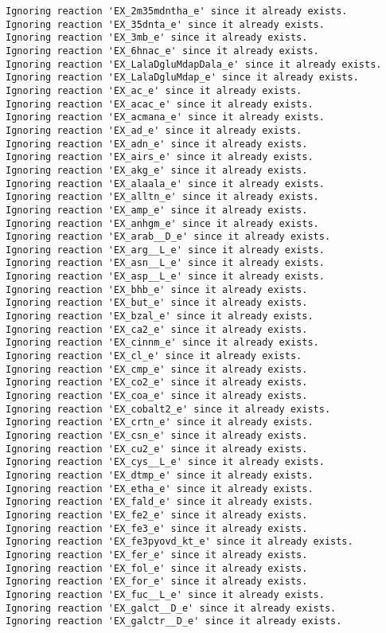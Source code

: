 \documentclass[
  letterpaper,
  DIV=11,
  numbers=noendperiod]{scrartcl}
\begin{document}
\begin{verbatim}
Ignoring reaction 'EX_2m35mdntha_e' since it already exists.
Ignoring reaction 'EX_35dnta_e' since it already exists.
Ignoring reaction 'EX_3mb_e' since it already exists.
Ignoring reaction 'EX_6hnac_e' since it already exists.
Ignoring reaction 'EX_LalaDgluMdapDala_e' since it already exists.
Ignoring reaction 'EX_LalaDgluMdap_e' since it already exists.
Ignoring reaction 'EX_ac_e' since it already exists.
Ignoring reaction 'EX_acac_e' since it already exists.
Ignoring reaction 'EX_acmana_e' since it already exists.
Ignoring reaction 'EX_ad_e' since it already exists.
Ignoring reaction 'EX_adn_e' since it already exists.
Ignoring reaction 'EX_airs_e' since it already exists.
Ignoring reaction 'EX_akg_e' since it already exists.
Ignoring reaction 'EX_alaala_e' since it already exists.
Ignoring reaction 'EX_alltn_e' since it already exists.
Ignoring reaction 'EX_amp_e' since it already exists.
Ignoring reaction 'EX_anhgm_e' since it already exists.
Ignoring reaction 'EX_arab__D_e' since it already exists.
Ignoring reaction 'EX_arg__L_e' since it already exists.
Ignoring reaction 'EX_asn__L_e' since it already exists.
Ignoring reaction 'EX_asp__L_e' since it already exists.
Ignoring reaction 'EX_bhb_e' since it already exists.
Ignoring reaction 'EX_but_e' since it already exists.
Ignoring reaction 'EX_bzal_e' since it already exists.
Ignoring reaction 'EX_ca2_e' since it already exists.
Ignoring reaction 'EX_cinnm_e' since it already exists.
Ignoring reaction 'EX_cl_e' since it already exists.
Ignoring reaction 'EX_cmp_e' since it already exists.
Ignoring reaction 'EX_co2_e' since it already exists.
Ignoring reaction 'EX_coa_e' since it already exists.
Ignoring reaction 'EX_cobalt2_e' since it already exists.
Ignoring reaction 'EX_crtn_e' since it already exists.
Ignoring reaction 'EX_csn_e' since it already exists.
Ignoring reaction 'EX_cu2_e' since it already exists.
Ignoring reaction 'EX_cys__L_e' since it already exists.
Ignoring reaction 'EX_dtmp_e' since it already exists.
Ignoring reaction 'EX_etha_e' since it already exists.
Ignoring reaction 'EX_fald_e' since it already exists.
Ignoring reaction 'EX_fe2_e' since it already exists.
Ignoring reaction 'EX_fe3_e' since it already exists.
Ignoring reaction 'EX_fe3pyovd_kt_e' since it already exists.
Ignoring reaction 'EX_fer_e' since it already exists.
Ignoring reaction 'EX_fol_e' since it already exists.
Ignoring reaction 'EX_for_e' since it already exists.
Ignoring reaction 'EX_fuc__L_e' since it already exists.
Ignoring reaction 'EX_galct__D_e' since it already exists.
Ignoring reaction 'EX_galctr__D_e' since it already exists.

\end{verbatim}
\end{document}
